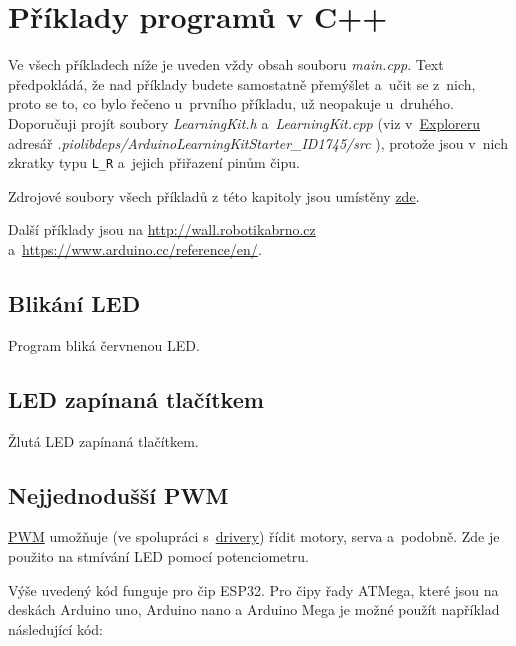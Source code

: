 

\section{Příklady programů v C++}   \label{cpppr}

Ve všech příkladech níže je uveden vždy obsah souboru {\it main.cpp}. 
Text předpokládá, že nad příklady budete samostatně přemýšlet a~učit se z~nich, proto se to, co bylo řečeno u~prvního příkladu, už neopakuje u~druhého.  
Doporučuji projít soubory {\it LearningKit.h}
a~{\it LearningKit.cpp} (viz v~\hyperlink{explorer}{Exploreru}
adresář {\it .piolibdeps/ArduinoLearningKitStarter\_ID1745/src} ), protože jsou v~nich zkratky typu {\tt L\_R} a~jejich přiřazení pinům čipu.

Zdrojové soubory všech příkladů z této kapitoly jsou umístěny
\href{https://github.com/RoboticsBrno/RoboticsBrno-guides/tree/RoboticsManual/RoboticsManual/priklady_c}{zde}.


Další příklady jsou na \url{http://wall.robotikabrno.cz} a~\url{https://www.arduino.cc/reference/en/}.  

\label{cpppr1} \subsection{Blikání LED} 

Program bliká červnenou LED.   




\label{cpppr2} \subsection{LED zapínaná tlačítkem} 

Žlutá LED zapínaná tlačítkem.  




\label{cpppr3} \subsection{Nejjednodušší PWM} 

\hyperref[PWM]{PWM}   umožňuje (ve spolupráci
s~\hyperref[driver]{drivery}) řídit motory, serva a~podobně. Zde je použito na stmívání LED pomocí potenciometru.




Výše uvedený kód funguje pro čip ESP32. Pro čipy řady ATMega, které jsou na deskách Arduino uno, Arduino nano a Arduino Mega je možné použít například následující kód: 

